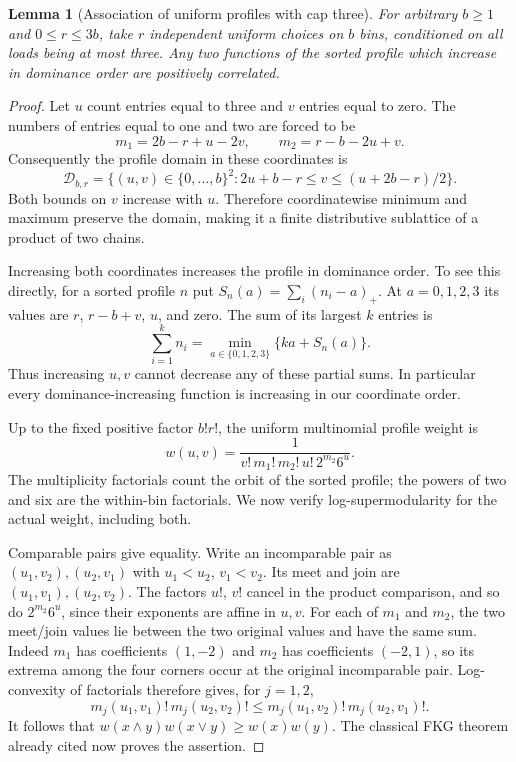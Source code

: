 \documentclass[11pt]{article}
\newtheorem{lemma}{Lemma}
\begin{document}
\begin{lemma}[Association of uniform profiles with cap three]\label{lem:capthreefkg}
For arbitrary $b\geq1$ and $0\leq r\leq3b$, take $r$ independent
uniform choices on $b$ bins, conditioned on all loads being at most
three. Any two functions of the sorted profile which increase in
dominance order are positively correlated.
\end{lemma}
\begin{proof}
Let $u$ count entries equal to three and $v$ entries equal to zero.
The numbers of entries equal to one and two are forced to be
\[
 m_1=2b-r+u-2v,\qquad m_2=r-b-2u+v.
\]
Consequently the profile domain in these coordinates is
\[
 \mathcal D_{b,r}=\{(u,v)\in\{0,\ldots,b\}^2:
             2u+b-r\leq v\leq(u+2b-r)/2\}.
\]
Both bounds on $v$ increase with $u$. Therefore coordinatewise
minimum and maximum preserve the domain, making it a finite
distributive sublattice of a product of two chains.

Increasing both coordinates increases the profile in dominance
order. To see this directly, for a sorted profile $n$ put
$S_n(a)=\sum_i(n_i-a)_+$. At $a=0,1,2,3$ its values are
$r$, $r-b+v$, $u$, and zero. The sum of its largest $k$ entries is
\[
 \sum_{i=1}^k n_i
 =\min_{a\in\{0,1,2,3\}}\{ka+S_n(a)\}.
\]
Thus increasing $u,v$ cannot decrease any of these partial sums.
In particular every dominance-increasing function is increasing in
our coordinate order.

Up to the fixed positive factor $b!r!$, the uniform multinomial
profile weight is
\[
 w(u,v)=\frac{1}{v!\,m_1!\,m_2!\,u!\,2^{m_2}6^u}.
\]
The multiplicity factorials count the orbit of the sorted profile;
the powers of two and six are the within-bin factorials. We now
verify log-supermodularity for the actual weight, including both.

Comparable pairs give equality. Write an incomparable pair as
$(u_1,v_2),(u_2,v_1)$ with $u_1<u_2$, $v_1<v_2$. Its meet and
join are $(u_1,v_1),(u_2,v_2)$. The factors $u!$, $v!$ cancel
in the product comparison, and so do $2^{m_2}6^u$, since their
exponents are affine in $u,v$. For each of $m_1$ and $m_2$,
the two meet/join values lie between the two original values and
have the same sum. Indeed $m_1$ has coefficients $(1,-2)$ and
$m_2$ has coefficients $(-2,1)$, so its extrema among the four
corners occur at the original incomparable pair. Log-convexity of
factorials therefore gives, for $j=1,2$,
\[
 m_j(u_1,v_1)!\,m_j(u_2,v_2)!
 \leq m_j(u_1,v_2)!\,m_j(u_2,v_1)!.
\]
It follows that
$w(x\wedge y)w(x\vee y)\geq w(x)w(y)$.
The classical FKG theorem already cited now proves the assertion.
\end{proof}
\end{document}
